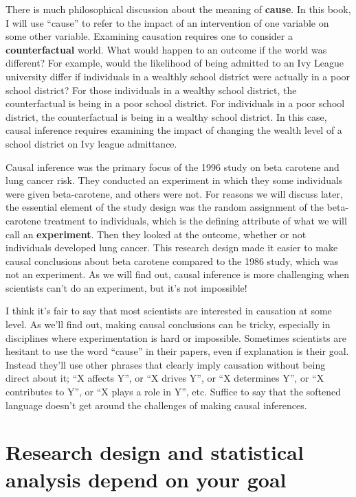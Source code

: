 \documentclass[
]{book}
\begin{document}
\begin{enumerate}
  There is much philosophical discussion about the meaning of \textbf{cause}. In this book, I will use ``cause'' to refer to the impact of an intervention of one variable on some other variable. Examining causation requires one to consider a \textbf{counterfactual} world. What would happen to an outcome if the world was different? For example, would the likelihood of being admitted to an Ivy League university differ if individuals in a wealthly school district were actually in a poor school district? For those individuals in a wealthy school district, the counterfactual is being in a poor school district. For individuals in a poor school district, the counterfactual is being in a wealthy school district. In this case, causal inference requires examining the impact of changing the wealth level of a school district on Ivy league admittance.

  Causal inference was the primary focus of the 1996 study on beta carotene and lung cancer risk. They conducted an experiment in which they some individuals were given beta-carotene, and others were not. For reasons we will discuss later, the essential element of the study design was the random assignment of the beta-carotene treatment to individuals, which is the defining attribute of what we will call an \textbf{experiment}. Then they looked at the outcome, whether or not individuals developed lung cancer. This research design made it easier to make causal conclusions about beta carotene compared to the 1986 study, which was not an experiment. As we will find out, causal inference is more challenging when scientists can't do an experiment, but it's not impossible!

  I think it's fair to say that most scientists are interested in causation at some level. As we'll find out, making causal conclusions can be tricky, especially in disciplines where experimentation is hard or impossible. Sometimes scientists are hesitant to use the word ``cause'' in their papers, even if explanation is their goal. Instead they'll use other phrases that clearly imply causation without being direct about it; ``X affects Y'', or ``X drives Y'', or ``X determines Y'', or ``X contributes to Y'', or ``X plays a role in Y'', etc. Suffice to say that the softened language doesn't get around the challenges of making causal inferences.
\end{enumerate}

\section{Research design and statistical analysis depend on your goal}\label{research-design-and-statistical-analysis-depend-on-your-goal}
\end{document}
